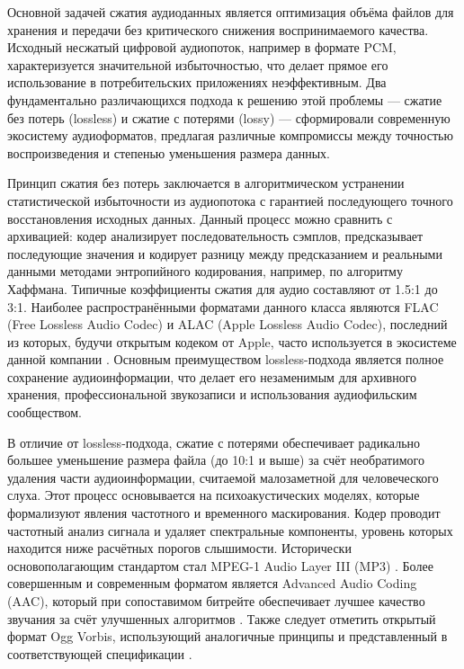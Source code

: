 \documentclass{SibFU-docs}
\begin{document}
Основной задачей сжатия аудиоданных является оптимизация объёма файлов для хранения и передачи без критического снижения воспринимаемого качества. Исходный несжатый цифровой аудиопоток, например в формате PCM, характеризуется значительной избыточностью, что делает прямое его использование в потребительских приложениях неэффективным. Два фундаментально различающихся подхода к решению этой проблемы — сжатие без потерь (lossless) и сжатие с потерями (lossy) — сформировали современную экосистему аудиоформатов, предлагая различные компромиссы между точностью воспроизведения и степенью уменьшения размера данных.


Принцип сжатия без потерь заключается в алгоритмическом устранении статистической избыточности из аудиопотока с гарантией последующего точного восстановления исходных данных. Данный процесс можно сравнить с архивацией: кодер анализирует последовательность сэмплов, предсказывает последующие значения и кодирует разницу между предсказанием и реальными данными методами энтропийного кодирования, например, по алгоритму Хаффмана. Типичные коэффициенты сжатия для аудио составляют от 1.5:1 до 3:1. Наиболее распространёнными форматами данного класса являются FLAC (Free Lossless Audio Codec) и ALAC (Apple Lossless Audio Codec), последний из которых, будучи открытым кодеком от Apple, часто используется в экосистеме данной компании \cite{alac_apple}. Основным преимуществом lossless-подхода является полное сохранение аудиоинформации, что делает его незаменимым для архивного хранения, профессиональной звукозаписи и использования аудиофильским сообществом.


В отличие от lossless-подхода, сжатие с потерями обеспечивает радикально большее уменьшение размера файла (до 10:1 и выше) за счёт необратимого удаления части аудиоинформации, считаемой малозаметной для человеческого слуха. Этот процесс основывается на психоакустических моделях, которые формализуют явления частотного и временного маскирования. Кодер проводит частотный анализ сигнала и удаляет спектральные компоненты, уровень которых находится ниже расчётных порогов слышимости. Исторически основополагающим стандартом стал MPEG-1 Audio Layer III (MP3) \cite{iso11172_3}. Более совершенным и современным форматом является Advanced Audio Coding (AAC), который при сопоставимом битрейте обеспечивает лучшее качество звучания за счёт улучшенных алгоритмов \cite{iso14496_3}. Также следует отметить открытый формат Ogg Vorbis, использующий аналогичные принципы и представленный в соответствующей спецификации \cite{vorbis_spec}.
\end{document}
